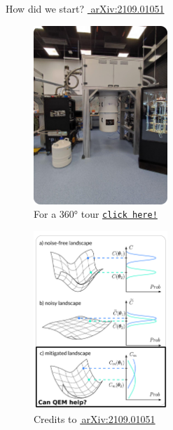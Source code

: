 \documentclass[8pt, xcolor={svgnames}, hyperref={linkcolor=black}]{beamer}
\begin{document}
\begin{frame}{How did we start? \hfill \href{https://arxiv.org/abs/2109.01051}{\faBook\,\,arXiv:2109.01051}}
\begin{multicols}{2}
\begin{figure}
\includegraphics[width=0.45\textwidth, height=0.8\textheight]{figures/tii_lab.png}
\caption*{For a 360° tour \href{https://files-prod.tii.ae/360/TII-QRC-Computing-Lab.html}{\texttt{click here!}}}
\end{figure}
\begin{figure}
\includegraphics[width=0.45\textwidth, height=0.8\textheight]{figures/NIBP_3.png}
\caption*{Credits to \href{https://arxiv.org/abs/2109.01051}{\faBook\,arXiv:2109.01051}}
\end{figure}
\end{multicols}
\end{frame}
\end{document}
